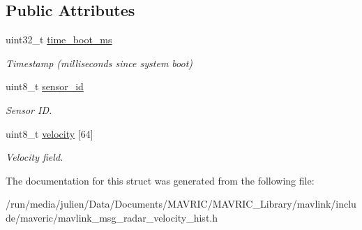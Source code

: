 \subsection*{Public Attributes}
\begin{DoxyCompactItemize}
\item 
\hypertarget{struct____mavlink__radar__velocity__hist__t_aa4dc91375e83f590224394343a6ecdcb}{uint32\+\_\+t \hyperlink{struct____mavlink__radar__velocity__hist__t_aa4dc91375e83f590224394343a6ecdcb}{time\+\_\+boot\+\_\+ms}}\label{struct____mavlink__radar__velocity__hist__t_aa4dc91375e83f590224394343a6ecdcb}

\begin{DoxyCompactList}\small\item\em Timestamp (milliseconds since system boot) \end{DoxyCompactList}\item 
\hypertarget{struct____mavlink__radar__velocity__hist__t_a4cc3b80cee5a14b5977ff661e5d41d22}{uint8\+\_\+t \hyperlink{struct____mavlink__radar__velocity__hist__t_a4cc3b80cee5a14b5977ff661e5d41d22}{sensor\+\_\+id}}\label{struct____mavlink__radar__velocity__hist__t_a4cc3b80cee5a14b5977ff661e5d41d22}

\begin{DoxyCompactList}\small\item\em Sensor I\+D. \end{DoxyCompactList}\item 
\hypertarget{struct____mavlink__radar__velocity__hist__t_a70e557375dac2acee52e20388c9d4a8f}{uint8\+\_\+t \hyperlink{struct____mavlink__radar__velocity__hist__t_a70e557375dac2acee52e20388c9d4a8f}{velocity} \mbox{[}64\mbox{]}}\label{struct____mavlink__radar__velocity__hist__t_a70e557375dac2acee52e20388c9d4a8f}

\begin{DoxyCompactList}\small\item\em Velocity field. \end{DoxyCompactList}\end{DoxyCompactItemize}


The documentation for this struct was generated from the following file\+:\begin{DoxyCompactItemize}
\item 
/run/media/julien/\+Data/\+Documents/\+M\+A\+V\+R\+I\+C/\+M\+A\+V\+R\+I\+C\+\_\+\+Library/mavlink/include/maveric/mavlink\+\_\+msg\+\_\+radar\+\_\+velocity\+\_\+hist.\+h\end{DoxyCompactItemize}
